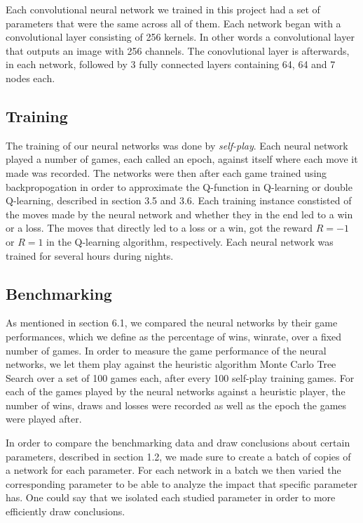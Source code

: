 \documentclass[titlepage]{article}
\begin{document}
\vskip 0.2cm

\noindent
Each convolutional neural network we trained in this project had a set of parameters that were the same across all of them. Each network began with a convolutional layer consisting of 256 kernels. In other words a convolutional layer that outputs an image with 256 channels. The conovlutional layer is afterwards, in each network, followed by 3 fully connected layers containing 64, 64 and 7 nodes each.

\subsection{Training}

\vskip 0.2cm

The training of our neural networks was done by \emph{self-play}. Each neural network played a number of games, each called an epoch, against itself where each move it made was recorded. The networks were then after each game trained using backpropogation in order to approximate the Q-function in Q-learning or double Q-learning, described in section 3.5 and 3.6. Each training instance constisted of the moves made by the neural network and whether they in the end led to a win or a loss. The moves that directly led to a loss or a win, got the reward $R = -1$ or $R = 1$ in the Q-learning algorithm, respectively. Each neural network was trained for several hours during nights.

\newpage

\subsection{Benchmarking}

\vskip 0.2cm

As mentioned in section 6.1, we compared the neural networks by their game performances, which we define as the percentage of wins, winrate, over a fixed number of games. In order to measure the game performance of the neural networks, we let them play against the heuristic algorithm Monte Carlo Tree Search over a set of 100 games each, after every 100 self-play training games. For each of the games played by the neural networks against a heuristic player, the number of wins, draws and losses were recorded as well as the epoch the games were played after.

\vskip 0.2cm

\noindent
In order to compare the benchmarking data and draw conclusions about certain parameters, described in section 1.2, we made sure to create a batch of copies of a network for each parameter. For each network in a batch we then varied the corresponding parameter to be able to analyze the impact that specific parameter has. One could say that we isolated each studied parameter in order to more efficiently draw conclusions.
\end{document}
